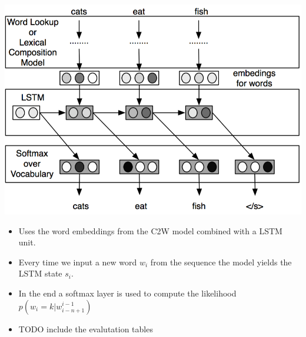 \documentclass[11pt, a4paper, landscape]{article}
\begin{document}
\vfill
\begin{minipage}[b]{.4\linewidth}
  \begin{center}
    \includegraphics[width=\linewidth]{../article/img/c2w-language-model}
  \end{center}
\end{minipage}
\begin{minipage}[b]{.6\linewidth}
  \begin{itemize}
  \item Uses the word embeddings from the C2W model combined with a LSTM unit.
  \item Every time we input a new word $w_i$ from the sequence the model yields the LSTM state $s_i$.
  \item In the end a softmax layer is used to compute the likelihood $p(w_i = k | w_{i-n+1}^{i-1})$
  \end{itemize}
\end{minipage}
\vfill

\NewPage{}

\vfill
\begin{itemize}
\item TODO include the evalutation tables
\end{itemize}
\vfill


\end{document}
